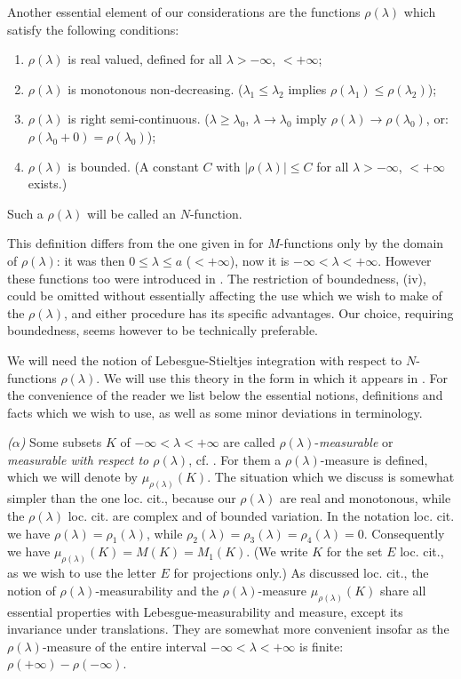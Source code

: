 \documentclass[b5paper,12pt,twoside]{article}
\numberwithin{equation}{section}
\theoremstyle{vnplain}
\theoremstyle{vndefinition}
\begin{document}
Another essential element of our considerations are the functions
$\rho(\lambda)$ which satisfy the following conditions:
\begin{enumerate}[label=(\roman*)]
\item $\rho(\lambda)$ is real valued, defined for all
$\lambda>-\infty$, $<+\infty$;
\item $\rho(\lambda)$ is monotonous non-decreasing.
($\lambda_1\leq\lambda_2$ implies
$\rho(\lambda_1)\leq\rho(\lambda_2)$);
\item $\rho(\lambda)$ is right semi-continuous.
($\lambda\geq\lambda_0$, $\lambda\to\lambda_0$ imply
$\rho(\lambda)\to\rho(\lambda_0)$, or:
$\rho(\lambda_0+0)=\rho(\lambda_0)$);
\item $\rho(\lambda)$ is bounded. (A constant $C$ with
$|\rho(\lambda)|\leq C$ for all $\lambda>-\infty$, $<+\infty$ exists.)
\end{enumerate}
Such a $\rho(\lambda)$ will be called an $N$-function.

This definition differs from the one given in \cite[p. 193]{ref4}
for $M$-functions only by the domain of $\rho(\lambda)$: it was then
$0\leq\lambda\leq a$ ($<+\infty$), now it is
$-\infty<\lambda<+\infty$. However these functions too were introduced in
\cite[p. 199]{ref4}. The restriction of boundedness, (iv), could be
omitted without essentially affecting the use which we wish to make of the
$\rho(\lambda)$, and either procedure has its specific advantages. Our choice,
requiring boundedness, seems however to be technically preferable.

We will need the notion of Lebesgue-Stieltjes integration with respect to
$N$-functions $\rho(\lambda)$. We will use this theory in the form in which it
appears in \cite[pp. 198--221]{ref11}. For the convenience of the reader we
list below the essential notions, definitions and facts which we wish to use, as
well as some minor deviations in terminology.

\noindent\textit{($\alpha$)} Some subsets $K$ of
$-\infty<\lambda<+\infty$ are called $\rho(\lambda)$-\emph{measurable} or
\emph{measurable with respect to $\rho(\lambda)$}, cf.
\cite[pp. 203--205]{ref11}. For them a $\rho(\lambda)$-measure is defined,
which we will denote by $\mu_{\rho(\lambda)}(K)$. The situation which we
discuss is somewhat simpler than the one loc. cit., because our
$\rho(\lambda)$ are real and monotonous, while the $\rho(\lambda)$ loc. cit.
are complex and of bounded variation. In the notation loc. cit. we have
$\rho(\lambda)=\rho_1(\lambda)$, while
$\rho_2(\lambda)=\rho_3(\lambda)=\rho_4(\lambda)=0$. Consequently we have
$\mu_{\rho(\lambda)}(K)=M(K)=M_1(K)$. (We write $K$ for the set $E$ loc. cit.,
as we wish to use the letter $E$ for projections only.) As discussed loc. cit.,
the notion of $\rho(\lambda)$-measurability and the
$\rho(\lambda)$-measure $\mu_{\rho(\lambda)}(K)$ share all essential properties
with Lebesgue-measurability and measure, except its invariance under
translations. They are somewhat more convenient insofar as the
$\rho(\lambda)$-measure of the entire interval $-\infty<\lambda<+\infty$ is
finite: $\rho(+\infty)-\rho(-\infty)$.
\end{document}
